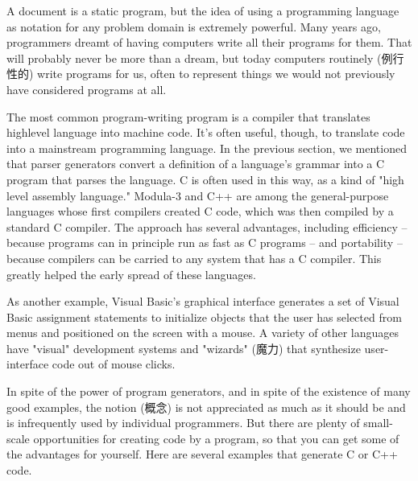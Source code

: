 A document is a static program, but the idea of using a programming
language as notation for any problem domain is extremely powerful. Many
years ago, programmers dreamt of having computers write all their programs
for them. That will probably never be more than a dream, but today
computers routinely (例行性的) write programs for us, often to represent
things we would not previously have considered programs at all.

The most common program-writing program is a compiler that translates
highlevel language into machine code. It's often useful, though, to
translate code into a mainstream programming language. In the previous
section, we mentioned that parser generators convert a definition of a
language's grammar into a C program that parses the language. C is often
used in this way, as a kind of "high level assembly language." Modula-3 and
C++ are among the general-purpose languages whose first compilers created C
code, which was then compiled by a standard C compiler.  The approach has
several advantages, including efficiency -- because programs can in
principle run as fast as C programs -- and portability -- because compilers
can be carried to any system that has a C compiler. This greatly helped the
early spread of these languages.

As another example, Visual Basic's graphical interface generates a set of
Visual Basic assignment statements to initialize objects that the user has
selected from menus and positioned on the screen with a mouse. A variety of
other languages have "visual" development systems and "wizards" (魔力) that
synthesize user-interface code out of mouse clicks.

In spite of the power of program generators, and in spite of the existence
of many good examples, the notion (概念) is not appreciated as much as it
should be and is infrequently used by individual programmers. But there are
plenty of small-scale opportunities for creating code by a program, so that
you can get some of the advantages for yourself. Here are several examples
that generate C or C++ code.

